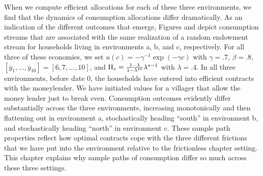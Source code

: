 When we compute efficient allocations for each of these three
environments, we  find that the dynamics of
consumption allocations differ dramatically. As an indication of the different outcomes that emerge,
Figures  and  depict   consumption streams
that are associated with the same
realization of a random endowment stream for households living
in environments a, b, and c, respectively.
For all three of these economies,
 we set $u(c) =-{\gamma}^{-1} \exp(-\gamma c)$
with $\gamma=.7$, $\beta =.8$,
$[\overline y_1, \ldots, \overline y_{10}] = [6, 7, \ldots, 10]$,
and $\Pi_s = {1-\lambda \over 1-\lambda^{10}} \lambda^{s-1}$ with
$\lambda=.4$.
In all three environments, before date $0$, the households have
entered into efficient contracts with the moneylender. We have initiated  values for a villager that allow the money lender just to break even.
%
Consumption outcomes evidently differ substantially across the
three environments, increasing monotonically and then flattening out in environment a,
stochastically heading ``south'' in environment b, and stochastically heading ``north'' in
environment c.
These sample path properties reflect how optimal contracts  cope with the three different frictions that we have put into the environment relative
to the frictionless chapter   setting.  This chapter  explains why  sample paths of consumption differ
so much across these three settings.


